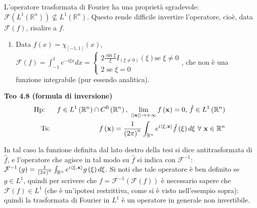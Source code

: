 \documentclass{article}
\begin{document}
L'operatore trasformata di Fourier ha una propriet\`{a} sgradevole: $%
\mathcal{F}\left( L^{1}\left( 
\mathbb{R}
^{n}\right) \right) \not\subseteq L^{1}\left( 
\mathbb{R}
^{n}\right) $. Questo rende difficile invertire l'operatore, cio\`{e}, data $%
\mathcal{F}\left( f\right) $, risalire a $f$.

\begin{enumerate}
\item Data $f\left( x\right) =\chi _{\left[ -1,1\right] }\left( x\right) $, $%
\mathcal{F}\left( f\right) =\int_{-1}^{1}e^{-i\xi x}dx=\left\{ 
\begin{array}{c}
2\frac{\sin \xi }{\xi }I_{\left( \xi \neq 0\right) }\left( \xi \right) \text{
se }\xi \neq 0 \\ 
2\text{ se }\xi =0%
\end{array}%
\right. $, che non \`{e} una funzione integrabile (pur essendo analitica).
\end{enumerate}

\textbf{Teo 4.8 (formula di inversione)} 
\begin{eqnarray*}
\text{Hp}\text{: } &&f\in L^{1}\left( 
\mathbb{R}
^{n}\right) \cap C^{0}\left( 
\mathbb{R}
^{n}\right) \text{, }\lim_{\left\vert \left\vert \mathbf{x}\right\vert
\right\vert \rightarrow +\infty }f\left( \mathbf{x}\right) =0\text{, }\hat{f}%
\in L^{1}\left( 
\mathbb{R}
^{n}\right) \\
\text{Ts} &\text{:}&\text{ }f\left( \mathbf{x}\right) =\frac{1}{\left( 2\pi
\right) ^{n}}\int_{%
\mathbb{R}
^{n}}e^{i\left\langle \mathbf{\xi ,x}\right\rangle }\hat{f}\left( \mathbf{%
\xi }\right) d\mathbf{\xi }\text{ }\forall \text{ }\mathbf{x}\in 
\mathbb{R}
^{n}
\end{eqnarray*}

In tal caso la funzione definita dal lato destro della tesi si dice
antitrasformata di $\hat{f}$, e l'operatore che agisce in tal modo su $\hat{f%
}$ si indica con $\mathcal{F}^{-1}$: $\mathcal{F}^{-1}\left( g\right) =\frac{%
1}{\left( 2\pi \right) ^{n}}\int_{%
\mathbb{R}
^{n}}e^{i\left\langle \mathbf{\xi ,x}\right\rangle }g\left( \mathbf{\xi }%
\right) d\mathbf{\xi }$. Si noti che tale operatore \`{e} ben definito se $%
g\in L^{1}$, quindi per scrivere che $f=\mathcal{F}^{-1}\left( \mathcal{F}%
\left( f\right) \right) $ \`{e} necessario sapere che $\mathcal{F}\left(
f\right) \in L^{1}$ (che \`{e} un'ipotesi restrittiva, come si \`{e} visto
nell'esempio sopra): quindi la trasformata di Fourier in $L^{1}$ \`{e} un
operatore in generale non invertibile.
\end{document}
